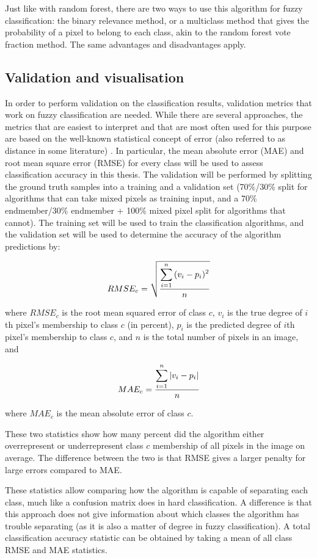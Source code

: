 \documentclass[a4paper,10pt]{article}
\begin{document}
Just like with random forest, there are two ways to use this algorithm for fuzzy classification: the binary relevance method, or a multiclass method that gives the probability of a pixel to belong to each class, akin to the random forest vote fraction method. The same advantages and disadvantages apply.

\subsection{Validation and visualisation}

In order to perform validation on the classification results, validation metrics that work on fuzzy classification are needed. While there are several approaches, the metrics that are easiest to interpret and that are most often used for this purpose are based on the well-known statistical concept of error (also referred to as distance in some literature) \cite{foody1996fuzzyevaluation}. In particular, the mean absolute error (MAE) and root mean square error (RMSE) for every class will be used to assess classification accuracy in this thesis. The validation will be performed by splitting the ground truth samples into a training and a validation set (70\%/30\% split for algorithms that can take mixed pixels as training input, and a 70\% endmember/30\% endmember + 100\% mixed pixel split for algorithms that cannot). The training set will be used to train the classification algorithms, and the validation set will be used to determine the accuracy of the algorithm predictions by:

$$ RMSE_c = \sqrt{ \displaystyle\sum_{i=1}^{n}{ (v_{i} - p_{i})^2 } \over{n} } $$

where $ RMSE_c $ is the root mean squared error of class $ c $, $ v_{i} $ is the true degree of $ i $th pixel's membership to class $ c $ (in percent), $ p_i $ is the predicted degree of $ i $th pixel's membership to class $ c $, and $ n $ is the total number of pixels in an image, and

$$ MAE_c = {\displaystyle\sum_{i=1}^{n}{ |v_{i} - p_{i}| } \over{n}} $$

where $ MAE_c $ is the mean absolute error of class $ c $.

These two statistics show how many percent did the algorithm either overrepresent or underrepresent class $ c $ membership of all pixels in the image on average. The difference between the two is that RMSE gives a larger penalty for large errors compared to MAE.

These statistics allow comparing how the algorithm is capable of separating each class, much like a confusion matrix does in hard classification. A difference is that this approach does not give information about which classes the algorithm has trouble separating (as it is also a matter of degree in fuzzy classification). A total classification accuracy statistic can be obtained by taking a mean of all class RMSE and MAE statistics.
\end{document}
